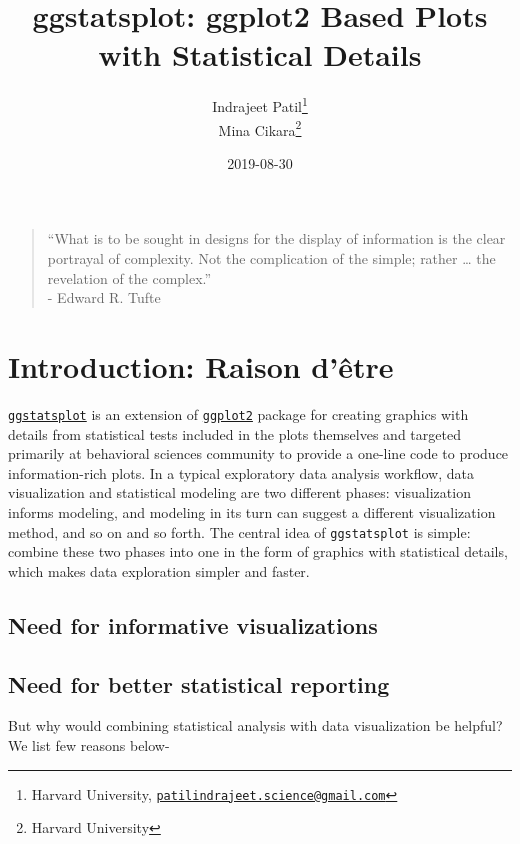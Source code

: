\documentclass[]{article}
\title{ggstatsplot: ggplot2 Based Plots with Statistical Details}
\author{Indrajeet Patil\footnote{Harvard University, \href{mailto:patilindrajeet.science@gmail.com}{\nolinkurl{patilindrajeet.science@gmail.com}}} \\ Mina Cikara\footnote{Harvard University}}
\date{2019-08-30}
\begin{document}
\maketitle

{
\hypersetup{linkcolor=black}
\setcounter{tocdepth}{2}
\tableofcontents
}
\begin{quote}
``What is to be sought in designs for the display of information is the clear
portrayal of complexity. Not the complication of the simple; rather \ldots{} the
revelation of the complex.''\\
- Edward R. Tufte
\end{quote}

\hypertarget{introduction-raison-detre}{%
\section{Introduction: Raison d'être}\label{introduction-raison-detre}}

\href{https://indrajeetpatil.github.io/ggstatsplot/}{\texttt{ggstatsplot}} is an extension
of \href{https://github.com/tidyverse/ggplot2}{\texttt{ggplot2}} package for creating
graphics with details from statistical tests included in the plots themselves
and targeted primarily at behavioral sciences community to provide a one-line
code to produce information-rich plots. In a typical exploratory data analysis
workflow, data visualization and statistical modeling are two different phases:
visualization informs modeling, and modeling in its turn can suggest a
different visualization method, and so on and so forth. The central idea of
\texttt{ggstatsplot} is simple: combine these two phases into one in the form of
graphics with statistical details, which makes data exploration simpler and
faster.

\hypertarget{need-for-informative-visualizations}{%
\subsection{Need for informative visualizations}\label{need-for-informative-visualizations}}

\hypertarget{need-for-better-statistical-reporting}{%
\subsection{Need for better statistical reporting}\label{need-for-better-statistical-reporting}}

But why would combining statistical analysis with data visualization be helpful?
We list few reasons below-
\end{document}
